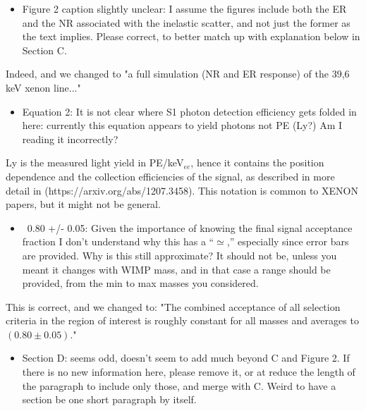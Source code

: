 \documentclass{article}
\begin{document}
\begin{itemize}
	\item {\color{blue} 
Figure 2 caption slightly unclear: I assume the figures include both
the ER and the NR associated with the inelastic scatter, and not just
the former as the text implies. Please correct, to better match up
with explanation below in Section C.}
\end{itemize}

Indeed, and we changed to "a full simulation (NR and ER response) of the 39,6\,keV xenon line..." 

\begin{itemize}
	\item {\color{blue} 
Equation 2: It is not clear where S1 photon detection efficiency gets
folded in here: currently this equation appears to yield photons not
PE (Ly?) Am I reading it incorrectly?}
\end{itemize}

Ly is the measured light yield in PE/keV$_{ee}$, hence it contains the position dependence
and the collection efficiencies of the signal, as described in more detail in 
(https://arxiv.org/abs/1207.3458). This notation is common to XENON papers, but it might not be 
general.


\begin{itemize}
	\item {\color{blue} 
~0.80 +/- 0.05: Given the importance of knowing the final signal
acceptance fraction I don’t understand why this has a “$\simeq$,” especially
since error bars are provided. Why is this still approximate? It
should not be, unless you meant it changes with WIMP mass, and in that
case a range should be provided, from the min to max masses you
considered.}
\end{itemize}

This is correct, and we changed to: "The combined acceptance  of all selection criteria in the region 
of interest is roughly constant for all masses and averages to $(0.80\pm0.05)$."



\begin{itemize}
	\item {\color{blue} 
Section D: seems odd, doesn’t seem to add much beyond C and Figure 2.
If there is no new information here, please remove it, or at reduce
the length of the paragraph to include only those, and merge with C.
Weird to have a section be one short paragraph by itself.}
\end{itemize}
\end{document}
